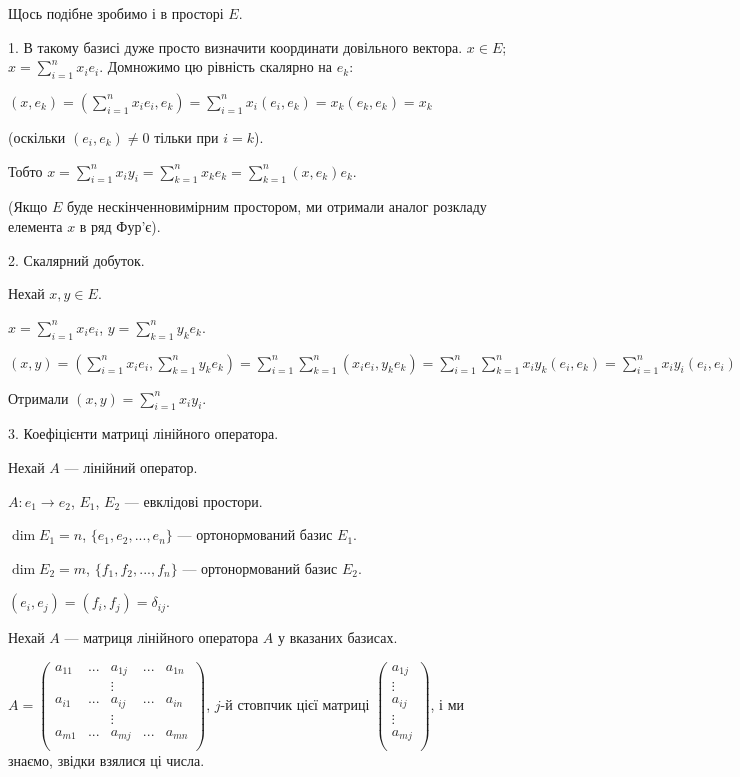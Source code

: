 Щось подібне зробимо і в просторі $E$.

1. В такому базисі дуже просто визначити координати довільного вектора.
$x \in E$; $x = \sum\limits_{i=1}^n x_i e_i$. Домножимо цю рівність скалярно на $e_k$:

$(x, e_k)
= (\sum\limits_{i=1}^n x_i e_i, e_k)
= \sum\limits_{i=1}^n x_i (e_i, e_k)
= x_k (e_k, e_k)
= x_k$

(оскільки $(e_i, e_k) \neq 0$ тільки при $i = k$).

Тобто $x = \sum\limits_{i=1}^n x_i y_i
= \sum\limits_{k=1}^n x_k e_k
= \sum\limits_{k=1}^n (x, e_k) e_k.$

(Якщо $E$ буде нескінченновимірним простором, ми отримали аналог
розкладу елемента $x$ в ряд Фур’є).

2. Скалярний добуток.

Нехай $x, y \in E$.

$x = \sum\limits_{i=1}^n x_i e_i$, $y = \sum\limits_{k=1}^n y_k e_k$.

$(x,y)
= (\sum\limits_{i=1}^n x_i e_i, \sum\limits_{k=1}^n y_k e_k)
= \sum\limits_{i=1}^n \sum\limits_{k=1}^n (x_i e_i, y_k e_k)
= \sum\limits_{i=1}^n \sum\limits_{k=1}^n x_i y_k (e_i, e_k)
= \sum\limits_{i=1}^n x_i y_i (e_i, e_i)
= \sum\limits_{i=1}^n x_i y_i.$

Отримали $(x,y) = \sum\limits_{i=1}^n x_i y_i.$

3. Коефіцієнти матриці лінійного оператора.

Нехай $A$ --- лінійний оператор.

$A:  e_1 \rightarrow e_2$, $E_1$, $E_2$ --- евклідові простори.

$\dim E_1 = n$, $\{e_1, e_2, ..., e_n\}$ --- ортонормований базис $E_1$.

$\dim E_2 = m$, $\{f_1, f_2, ..., f_n\}$ --- ортонормований базис $E_2$.

$(e_i,e_j) = (f_i,f_j) = \delta_{ij}$.

Нехай $A$ --- матриця лінійного оператора $A$ у вказаних базисах.

$A = \begin{pmatrix}
	a_{11} & ... & a_{1j} & ... & a_{1n} \\
	& & \vdots & & \\
	a_{i1} & ... & a_{ij} & ... & a_{in} \\
	& & \vdots & & \\
	a_{m1} & ... & a_{mj} & ... & a_{mn} \\
\end{pmatrix}$, $j$-й стовпчик цієї матриці $\begin{pmatrix}
	a_{1j} \\
	\vdots \\
	a_{ij} \\
	\vdots \\
	a_{mj} \\
\end{pmatrix}$, і ми знаємо, звідки взялися ці числа.

